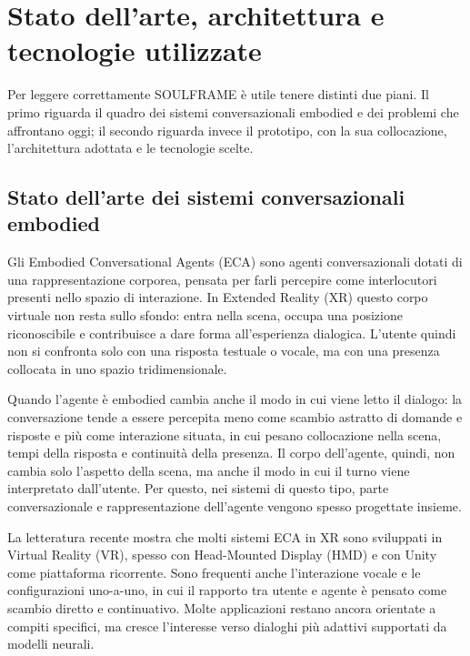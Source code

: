 \chapter{Stato dell'arte, architettura e tecnologie utilizzate}
\label{chap:stato-arte}

Per leggere correttamente SOULFRAME è utile tenere distinti due piani. Il primo riguarda il quadro dei sistemi conversazionali embodied e dei problemi che affrontano oggi; il secondo riguarda invece il prototipo, con la sua collocazione, l'architettura adottata e le tecnologie scelte.

\section{Stato dell'arte dei sistemi conversazionali embodied}
\label{sec:eca-xr}

Gli Embodied Conversational Agents (ECA) sono agenti conversazionali dotati di una rappresentazione corporea, pensata per farli percepire come interlocutori presenti nello spazio di interazione. In Extended Reality (XR) questo corpo virtuale non resta sullo sfondo: entra nella scena, occupa una posizione riconoscibile e contribuisce a dare forma all'esperienza dialogica. L'utente quindi non si confronta solo con una risposta testuale o vocale, ma con una presenza collocata in uno spazio tridimensionale.

Quando l'agente è embodied cambia anche il modo in cui viene letto il dialogo: la conversazione tende a essere percepita meno come scambio astratto di domande e risposte e più come interazione situata, in cui pesano collocazione nella scena, tempi della risposta e continuità della presenza. Il corpo dell'agente, quindi, non cambia solo l'aspetto della scena, ma anche il modo in cui il turno viene interpretato dall'utente. Per questo, nei sistemi di questo tipo, parte conversazionale e rappresentazione dell'agente vengono spesso progettate insieme.

La letteratura recente mostra che molti sistemi ECA in XR sono sviluppati in Virtual Reality (VR), spesso con Head-Mounted Display (HMD) e con Unity come piattaforma ricorrente. Sono frequenti anche l’interazione vocale e le configurazioni uno-a-uno, in cui il rapporto tra utente e agente è pensato come scambio diretto e continuativo. Molte applicazioni restano ancora orientate a compiti specifici, ma cresce l’interesse verso dialoghi più adattivi supportati da modelli neurali.\cite{Yang2025ECA_XR}

